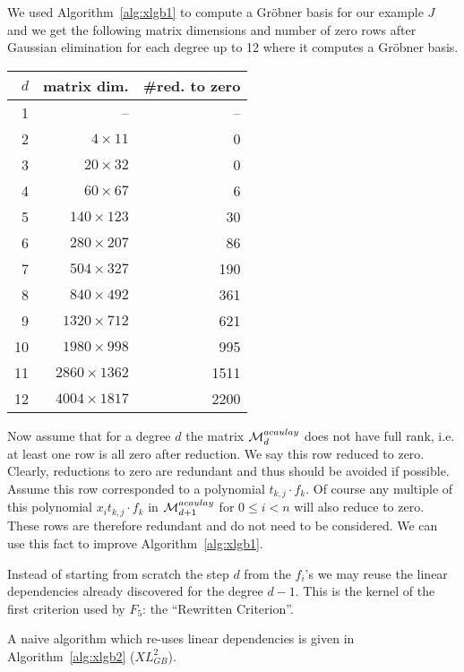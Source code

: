 We used Algorithm~\ref{alg:xlgb1} to compute a Gröbner basis for our example $J$ and we get the following matrix dimensions and number of zero rows after Gaussian elimination for each degree up to 12 where it computes a Gröbner basis.

\begin{center}
\begin{tabular}{|r|r|r|}
\hline
$d$ & matrix dim. & \#red. to zero\\
\hline
 1 &                 --&   --\\
 2 & $   4 \times   11$&    0\\
 3 & $  20 \times   32$&    0\\
 4 & $  60 \times   67$&    6\\
 5 & $ 140 \times  123$&   30\\
 6 & $ 280 \times  207$&   86\\
 7 & $ 504 \times  327$&  190\\
 8 & $ 840 \times  492$&  361\\
 9 & $1320 \times  712$&  621\\
10 & $1980 \times  998$&  995\\
11 & $2860 \times 1362$& 1511\\
12 & $4004 \times 1817$& 2200\\
\hline
\end{tabular}
\end{center}

Now assume that for a degree $d$ the matrix $\mathcal{M}^{acaulay}_{d}$ does not have full rank, i.e. at least one row is all zero after reduction. We say this row reduced to zero. Clearly, reductions to zero are redundant and thus should be avoided if possible. Assume this row corresponded to a polynomial $t_{k,j} \cdot f_k$. Of course any multiple of this polynomial $x_i t_{k,j} \cdot f_k$ in $\mathcal{M}^{acaulay}_{d+1}$ for $0 \leq i < n$ will also reduce to zero. These rows are therefore redundant and do not need to be considered. We can use this fact to improve Algorithm~\ref{alg:xlgb1}.

Instead of starting from scratch the step $d$ from the $f_i$'s we may reuse the linear dependencies already discovered for the degree $d-1$. This is the kernel of the first criterion used by $F_5$: the ``Rewritten Criterion''.

A naive algorithm which re-uses linear dependencies is given in Algorithm~\ref{alg:xlgb2} ($XL_{GB}^2$).

